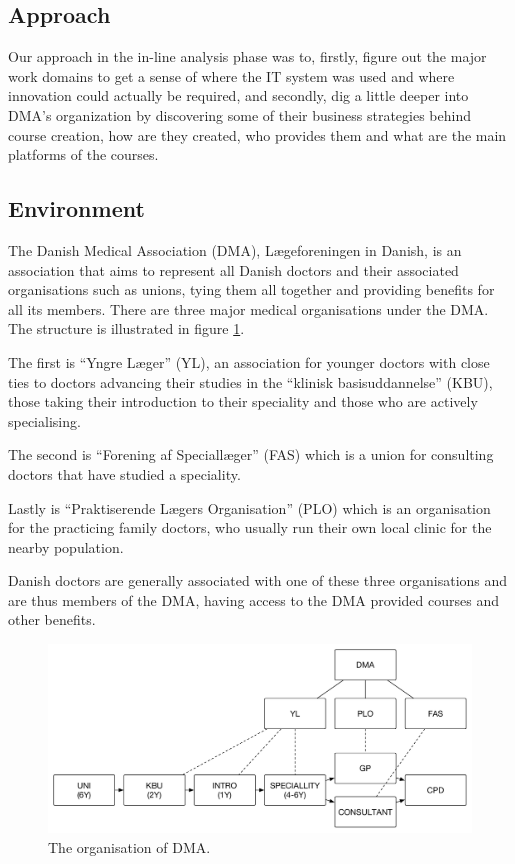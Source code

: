 \subsection{Approach}
Our approach in the in-line analysis phase was to, firstly, figure out the major work domains to get a sense of where the IT system was used and where innovation could actually be required, and secondly, dig a little deeper into DMA’s organization by discovering some of their business strategies behind course creation, how are they created, who provides them and what are the main platforms of the courses.

\subsection{Environment}

The Danish Medical Association (DMA), Lægeforeningen in Danish, is an association that aims to represent all Danish doctors and their associated organisations such as unions, tying them all together and providing benefits for all its members. There are three major medical organisations under the DMA. The structure is illustrated in figure \ref{fig:dmaorganisation}.

The first is “Yngre Læger” (YL), an association for younger doctors with close ties to doctors advancing their studies in the “klinisk basisuddannelse” (KBU), those taking their introduction to their speciality and those who are actively specialising.

The second is “Forening af Speciallæger” (FAS) which is a union for consulting doctors that have studied a speciality.

Lastly is “Praktiserende Lægers Organisation” (PLO) which is an organisation for the practicing family doctors, who usually run their own local clinic for the nearby population.

Danish doctors are generally associated with one of these three organisations and are thus members of the DMA, having access to the DMA provided courses and other benefits.

\begin{figure}[h!]
 \begin{center}
  \includegraphics[width=1\textwidth]{figures/dma-structure.pdf}
  \caption{The organisation of DMA.\label{fig:dmaorganisation}}
 \end{center}
\end{figure}

